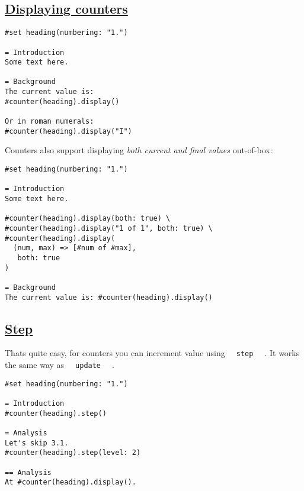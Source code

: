 \pandocbounded{}

\subsection{\texorpdfstring{\hyperref[displaying-counters]{Displaying
counters}}{Displaying counters}}\label{displaying-counters}

\begin{verbatim}
#set heading(numbering: "1.")

= Introduction
Some text here.

= Background
The current value is:
#counter(heading).display()

Or in roman numerals:
#counter(heading).display("I")
\end{verbatim}

\pandocbounded{}

Counters also support displaying \emph{both current and final values}
out-of-box:

\begin{verbatim}
#set heading(numbering: "1.")

= Introduction
Some text here.

#counter(heading).display(both: true) \
#counter(heading).display("1 of 1", both: true) \
#counter(heading).display(
  (num, max) => [#num of #max],
   both: true
)

= Background
The current value is: #counter(heading).display()
\end{verbatim}

\pandocbounded{}

\subsection{\texorpdfstring{\hyperref[step]{Step}}{Step}}\label{step}

That\textquotesingle s quite easy, for counters you can increment value
using \texttt{\ }{\texttt{\ step\ }}\texttt{\ } . It works the same way
as \texttt{\ }{\texttt{\ update\ }}\texttt{\ } .

\begin{verbatim}
#set heading(numbering: "1.")

= Introduction
#counter(heading).step()

= Analysis
Let's skip 3.1.
#counter(heading).step(level: 2)

== Analysis
At #counter(heading).display().
\end{verbatim}

